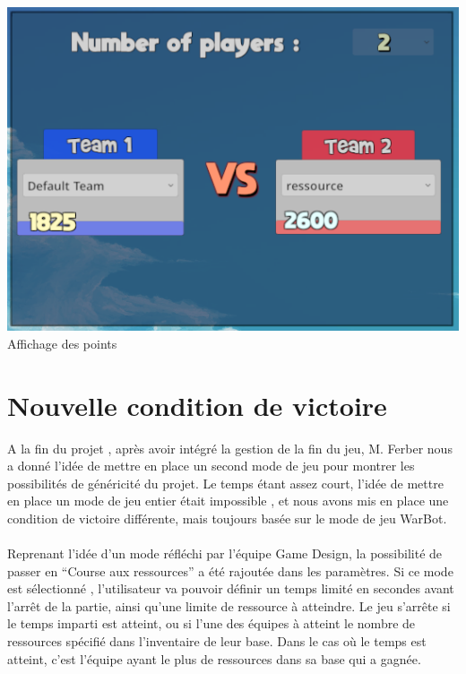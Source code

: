 \documentclass{report}
\begin{document}
\paragraph{}
\begin{center}
\includegraphics[scale=0.7]{DATA/Elo.png}
 {Affichage des points}
\end{center}
\paragraph{}

\newpage
\section{Nouvelle condition de victoire}
A la fin du projet , après avoir intégré la gestion de la fin du jeu, M. Ferber nous a donné l’idée de mettre en place un second mode de jeu pour montrer les possibilités de généricité du projet. Le temps étant assez court, l’idée de mettre en place un mode de jeu entier était impossible , et nous avons mis en place une condition de victoire différente, mais toujours basée sur le mode de jeu WarBot.
\paragraph{}
Reprenant l’idée d’un mode réfléchi par l’équipe Game Design, la possibilité de passer en “Course aux ressources” a été rajoutée dans les paramètres. Si ce mode est sélectionné , l’utilisateur va pouvoir définir un temps limité en secondes avant l’arrêt de la partie, ainsi qu’une limite de ressource à atteindre. Le jeu s’arrête si le temps imparti est atteint, ou si l’une des équipes à atteint le nombre de ressources spécifié dans l’inventaire de leur base. Dans le cas où le temps est atteint, c’est l’équipe ayant le plus de ressources dans sa base qui a gagnée. 
\end{document}
